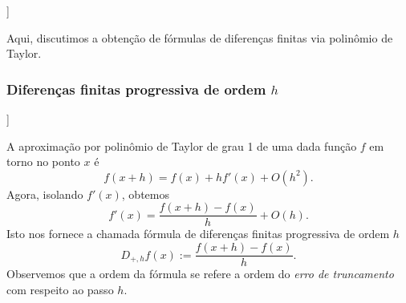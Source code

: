 \begin{flushleft}
  [[tag:revisar]]
\end{flushleft}

Aqui, discutimos a obtenção de fórmulas de diferenças finitas via polinômio de Taylor.

\subsubsection{Diferenças finitas progressiva de ordem $h$}

\begin{flushleft}
  [[tag:revisar]]
\end{flushleft}

A aproximação por polinômio de Taylor de grau 1 de uma dada função $f$ em torno no ponto $x$ é
\begin{equation}\label{eq:poli_Taylor_grau_1}
  f(x+h) = f(x) + hf'(x) + O(h^2).
\end{equation}
Agora, isolando $f'(x)$, obtemos
\begin{equation}
  f'(x) = \frac{f(x+h) - f(x)}{h} + O(h).
\end{equation}
Isto nos fornece a chamada fórmula de diferenças finitas progressiva de ordem $h$
\begin{equation}\label{eq:dfp_h}
  D_{+,h}f(x) := \frac{f(x+h) - f(x)}{h}.
\end{equation}
Observemos que a ordem da fórmula se refere a ordem do \emph{erro de truncamento} com respeito ao passo $h$.

